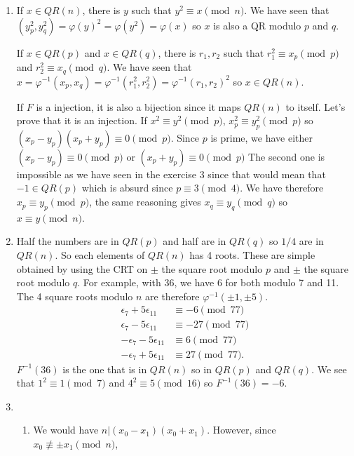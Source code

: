 \begin{solution}
	\begin{enumerate}
		\item
		If $x \in QR(n)$, there is $y$ such that $y^2 \equiv x \pmod{n}$.
		We have seen that $(y_p^2,y_q^2) = \varphi(y)^2 = \varphi(y^2) = \varphi(x)$
		so $x$ is also a QR modulo $p$ and $q$.
		
		If $x \in QR(p)$ and $x \in QR(q)$, there is $r_1,r_2$ such that
		$r_1^2 \equiv x_p \pmod{p}$ and $r_2^2 \equiv x_q \pmod{q}$.
		We have seen that
		$x = \varphi^{-1}(x_p,x_q) = \varphi^{-1}(r_1^2,r_2^2) = \varphi^{-1}(r_1,r_2)^2$
		so $x \in QR(n)$.
		
		If $F$ is a injection, it is also a bijection since it maps $QR(n)$ to itself.
		Let's prove that it is an injection.
		If $x^2 \equiv y^2 \pmod{p}$, $x_p^2 \equiv y_p^2 \pmod{p}$ so
		$(x_p-y_p)(x_p+y_p) \equiv 0 \pmod{p}$.
		Since $p$ is prime, we have either
		$(x_p-y_p) \equiv 0 \pmod{p}$
		or
		$(x_p+y_p) \equiv 0 \pmod{p}$
		The second one is impossible as we have seen in the exercise 3 since that would mean that $-1 \in QR(p)$
		which is absurd since $p \equiv 3 \pmod{4}$.
		We have therefore $x_p \equiv y_p \pmod{p}$,
		the same reasoning gives $x_q \equiv y_q \pmod{q}$ so $x \equiv y \pmod{n}$.
		\item
		Half the numbers are in $QR(p)$ and half are in $QR(q)$ so $1/4$ are in $QR(n)$.
		So each elements of $QR(n)$ has 4 roots.
		These are simple obtained by using the CRT on $\pm$ the square root modulo $p$
		and $\pm$ the square root modulo $q$.
		For example, with 36, we have $6$ for both modulo 7 and 11.
		The 4 square roots modulo $n$ are therefore $\varphi^{-1}(\pm 1, \pm 5)$.
		\begin{align*}
			\epsilon_7 + 5\epsilon_{11} & \equiv -6 \pmod{77}\\
			\epsilon_7 - 5\epsilon_{11} & \equiv -27 \pmod{77}\\
			-\epsilon_7 - 5\epsilon_{11} & \equiv 6 \pmod{77}\\
			-\epsilon_7 + 5\epsilon_{11} & \equiv 27 \pmod{77}.
		\end{align*}
		$F^{-1}(36)$ is the one that is in $QR(n)$ so in $QR(p)$ and $QR(q)$.
		We see that $1^2 \equiv 1 \pmod{7}$ and $4^2 \equiv 5 \pmod{16}$ so $F^{-1}(36) = -6$.
		\item
		\begin{enumerate}
			\item
			We would have $n | (x_0-x_1)(x_0+x_1)$.
			However, since $x_0 \not\equiv \pm x_1 \pmod{n}$,

\end{enumerate}
\end{enumerate}
\end{solution}
